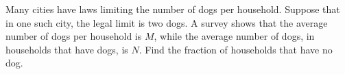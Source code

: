 Many cities have laws limiting the number of dogs per household.
Suppose that in one such city, the legal limit is two dogs.
A survey shows that the average number of dogs per household is
$M$, while the average number of dogs, in households that have
dogs, is $N$. Find the fraction of households that have no dog.\answercheck

